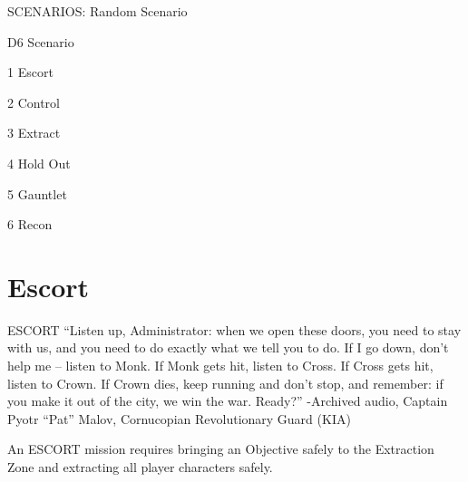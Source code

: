                                                 SCENARIOS:
Random Scenario


 D6                                                     Scenario

 1                                                      Escort

 2                                                      Control

 3                                                      Extract

 4                                                      Hold Out

 5                                                      Gauntlet

 6                                                      Recon


\section{Escort}


                                                               ESCORT
                                                               “Listen up, Administrator: when we open these
                                                               doors, you need to stay with us, and you need to
                                                               do exactly what we tell you to do. If I go down,
                                                               don’t help me -- listen to Monk. If Monk gets hit,
                                                               listen to Cross. If Cross gets hit, listen to Crown.
                                                               If Crown dies, keep running and don’t stop, and
                                                               remember: if you make it out of the city, we win
                                                               the war. Ready?”
                                                               -Archived audio, Captain Pyotr “Pat” Malov,
                                                               Cornucopian Revolutionary Guard (KIA)

                                                               An ESCORT mission requires bringing an
                                                               Objective safely to the Extraction Zone and
                                                               extracting all player characters safely.

